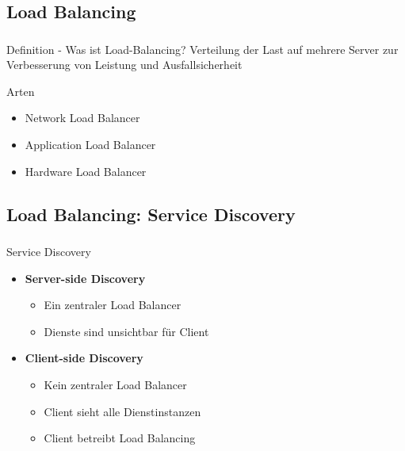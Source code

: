 \subsection{\textbf{Load Balancing}}
\begin{frame}
    \frametitle{\insertsection}
    \framesubtitle{\insertsubsection}
    \begin{block}{Definition - Was ist Load-Balancing?}
        Verteilung der Last auf mehrere Server zur Verbesserung von Leistung und Ausfallsicherheit
    \end{block}
    \begin{block}{Arten}
        \begin{itemize}
       		\item Network Load Balancer
       		\item Application Load Balancer
        	\item Hardware Load Balancer
         \end{itemize}
    \end{block}
\end{frame}

\subsection{Load Balancing: Service Discovery}
\begin{frame}
	\frametitle{\insertsection}
    \framesubtitle{\insertsubsection}
    \begin{block}{Service Discovery}
	\begin{itemize}
		\item \textbf{Server-side Discovery}
		\begin{itemize}
			\item Ein zentraler Load Balancer
			\item Dienste sind unsichtbar für Client
		\end{itemize}
			\item \textbf{Client-side Discovery}
		\begin{itemize}
			\item Kein zentraler Load Balancer
			\item Client sieht alle Dienstinstanzen
			\item Client betreibt Load Balancing
		\end{itemize}
	\end{itemize}
    \end{block}
\end{frame}

